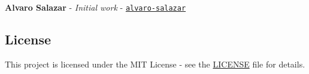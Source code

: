 \begin{DoxyItemize}
\item {\bfseries Alvaro Salazar} -\/ {\itshape Initial work} -\/ \href{https://github.com/alvaro-salazar}{\tt alvaro-\/salazar}
\end{DoxyItemize}

\subsection*{License}

This project is licensed under the M\+IT License -\/ see the \mbox{\hyperlink{md__l_i_c_e_n_s_e}{L\+I\+C\+E\+N\+SE}} file for details. 